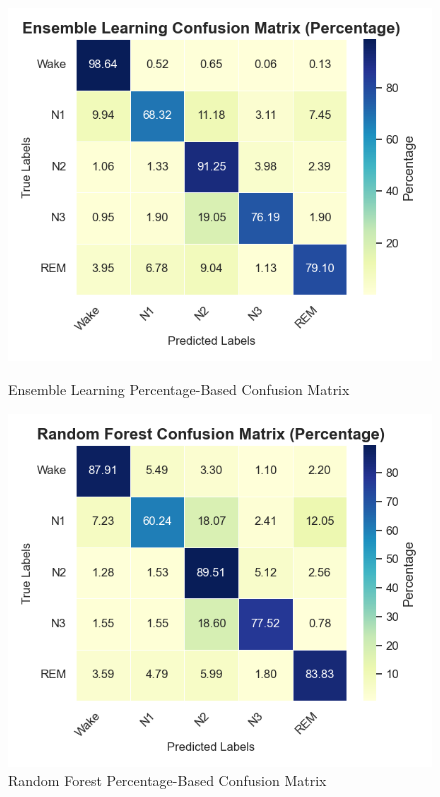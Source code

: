 \begin{figure}[H]
	\centering
	\begin{minipage}[t]{0.48\textwidth}
		\centering
		\includegraphics[width=\textwidth]{img/paper_1/Ensemble Learning_percentage_based.png}
		\caption{Ensemble Learning Percentage-Based Confusion Matrix}
	\end{minipage}
	\hfill
	\begin{minipage}[t]{0.48\textwidth}
		\centering
		\includegraphics[width=\textwidth]{img/paper_1/Random Forest_percentage_based.png}
		\caption{Random Forest Percentage-Based Confusion Matrix}
	\end{minipage}
\end{figure}

